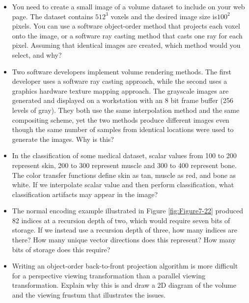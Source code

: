 \begin{itemize}
\item You need to create a small image of a volume dataset to include on your web page. The dataset contains $512^3$ voxels and the desired image size is$100^2$ pixels. You can use a software object-order method that projects each voxel onto the image, or a software ray casting method that casts one ray for each pixel. Assuming that identical images are created, which method would you select, and why?

\item Two software developers implement volume rendering methods. The first developer uses a software ray casting approach, while the second uses a graphics hardware texture mapping approach. The grayscale images are generated and displayed on a workstation with an 8 bit frame buffer (256 levels of gray). They both use the same interpolation method and the same compositing scheme, yet the two methods produce different images even though the same number of samples from identical locations were used to generate the images. Why is this?

\item In the classification of some medical dataset, scalar values from 100 to 200 represent skin, 200 to 300 represent muscle and 300 to 400 represent bone. The color transfer functions define skin as tan, muscle as red, and bone as white. If we interpolate scalar value and then perform classification, what classification artifacts may appear in the image?

\item The normal encoding example illustrated in Figure \ref{fig:Figure7-22} produced 82 indices at a recursion depth of two, which would require seven bits of storage. If we instead use a recursion depth of three, how many indices are there? How many unique vector directions does this represent? How many bits of storage does this require?

\item Writing an object-order back-to-front projection algorithm is more difficult for a perspective viewing transformation than a parallel viewing transformation. Explain why this is and draw a 2D diagram of the volume and the viewing frustum that illustrates the issues.

\end{itemize}
